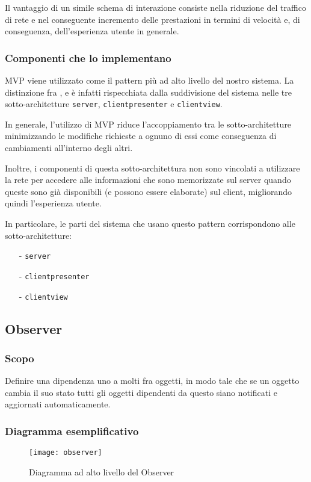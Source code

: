 Il vantaggio di un simile schema di interazione consiste nella riduzione del traffico di rete e nel conseguente incremento delle prestazioni in termini di velocità e, di conseguenza, dell'esperienza utente in generale.

\subsubsection{Componenti che lo implementano}
MVP viene utilizzato come il pattern più ad alto livello del nostro sistema. La distinzione fra ,  e  è infatti rispecchiata dalla suddivisione del sistema nelle tre sotto-architetture \texttt{server}, \texttt{clientpresenter} e \texttt{clientview}.

In generale, l'utilizzo di MVP riduce l'accoppiamento tra le sotto-architetture minimizzando le modifiche richieste a ognuno di essi come conseguenza di cambiamenti all'interno degli altri.

Inoltre, i componenti di questa sotto-architettura non sono vincolati a utilizzare la rete per accedere alle informazioni che sono memorizzate sul server quando queste sono già disponibili (e possono essere elaborate) sul client, migliorando quindi l'esperienza utente.

In particolare, le parti del sistema che usano questo pattern corrispondono alle sotto-architetture:
\begin{itemize}[noitemsep,nolistsep]
  \item[-] \texttt{server}
  \item[-] \texttt{clientpresenter}
  \item[-] \texttt{clientview}
\end{itemize}

\subsection{Observer}

\subsubsection{Scopo}
Definire una dipendenza uno a molti fra oggetti, in modo tale che se un oggetto cambia il suo stato tutti gli oggetti dipendenti da questo siano notificati e aggiornati automaticamente.

\subsubsection{Diagramma esemplificativo}
\begin{figure}[H]
\centering
\texttt{[image: observer]}
\caption{Diagramma ad alto livello del  Observer}\label{fig:observer}
\end{figure}

